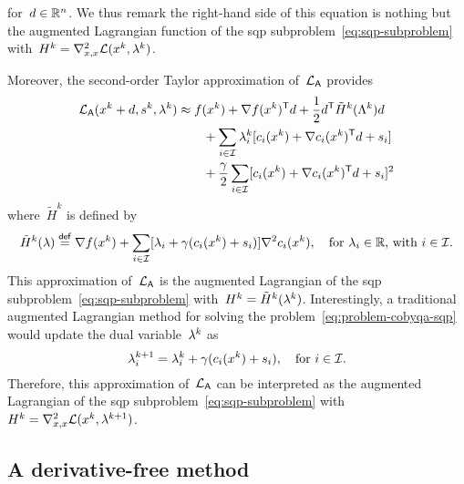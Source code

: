 for~$\step \in \R^n$.
We thus remark the right-hand side of this equation is nothing but the augmented Lagrangian function of the \gls{sqp} subproblem~\cref{eq:sqp-subproblem} with~$H^k = \nabla_{x, x}^2 \lag(\iter[k], \lm[k])$.

Moreover, the second-order Taylor approximation of~$\lag[\mathsf{A}]$ provides
\begin{align*}
    \lag[\mathsf{A}](\iter[k] + d, s^k, \lm[k]) & \approx \obj(\iter[k]) + \nabla \obj(\iter[k])^{\T} d + \frac{1}{2} d^{\T} \tilde{H}^k(\Lambda^k) d\\
                                                & \qquad + \sum_{i \in \iub} \lm[k]_i [\con{i}(\iter[k]) + \nabla \con{i}(\iter[k])^{\T} d + s_i]\\
                                                & \qquad + \frac{\gamma}{2} \sum_{i \in \iub} [\con{i}(\iter[k]) + \nabla \con{i}(\iter[k])^{\T} d + s_i]^2\\
\end{align*}
where~$\tilde{H}^k$ is defined by
\begin{equation*}
    \tilde{H}^k(\lm) \eqdef \nabla \obj(\iter[k]) + \sum_{i \in \iub} [\lm_i + \gamma (\con{i}(\iter[k]) + s_i)] \nabla^2 \con{i}(\iter[k]), \quad \text{for~$\lm_i \in \R$, with~$i \in \iub$.}
\end{equation*}
This approximation of~$\lag[\mathsf{A}]$ is the augmented Lagrangian of the \gls{sqp} subproblem~\cref{eq:sqp-subproblem} with~$H^k = \tilde{H}^k(\lm[k])$.
Interestingly, a traditional augmented Lagrangian method for solving the problem~\cref{eq:problem-cobyqa-sqp} would update the dual variable~$\lm[k]$ as
\begin{equation*}
    \lm_i^{k + 1} = \lm[k]_i + \gamma (\con{i}(\iter[k]) + s_i), \quad \text{for~$i \in \iub$}.
\end{equation*}
Therefore, this approximation of~$\lag[\mathsf{A}]$ can be interpreted as the augmented Lagrangian of the \gls{sqp} subproblem~\cref{eq:sqp-subproblem} with~$H^k = \nabla_{x, x}^2 \lag(\iter[k], \lm[k + 1])$.

\subsection{A derivative-free  method}
\label{subsec:derivative-free-sqp}

